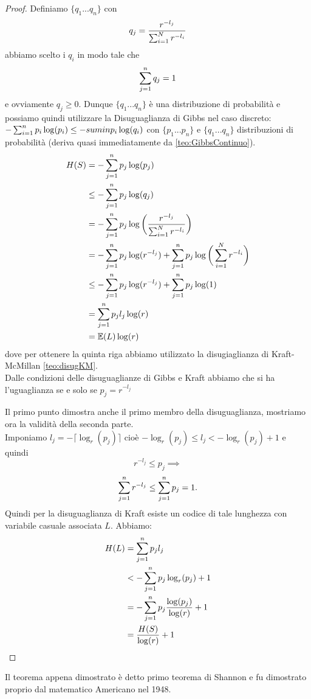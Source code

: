 \begin{proof}
\item Definiamo $\{q_1...q_n \}$ con
\begin{equation}
q_j=\frac{r^{-l_j}}{\sum_{i=1}^N r^{-l_i}}
\end{equation}
abbiamo scelto i $q_i$ in modo tale che 
$$\sum_{j=1}^n q_j=1$$
e ovviamente $q_j\geq 0$.
Dunque $\{q_1...q_n \}$ è una distribuzione di probabilità e possiamo quindi utilizzare la Disuguaglianza di Gibbs nel caso discreto: $- \sum_{i=1}^n p_i \log(p_i) \leq -sumin p_i \log(q_i)$ con $\{p_1...p_n \}$ e $\{q_1...q_n \}$ distribuzioni di probabilità (deriva quasi immediatamente da \ref{teo:GibbsContinuo}).\\
\[
\begin{split}
H(S)& = - \sum_{j=1}^n p_j \log(p_j) \\
& \leq  - \sum_{j=1}^n p_j \log(q_j)\\
& =  - \sum_{j=1}^n p_j \log \bigg(\frac{r^{-l_j}}{\sum_{i=1}^N r^{-l_i}} \bigg)\\
& =  - \sum_{j=1}^n p_j \log ( r^{-l_j}) +\sum_{j=1}^n p_j \log \bigg( \sum_{i=1}^N r^{-l_i} \bigg)\\
& \leq - \sum_{j=1}^n p_j \log ( r^{-l_j}) +\sum_{j=1}^n p_j \log (1)\\
& =\sum_{j=1}^n p_j l_j \log ( r)\\
&= \mathbb{E}(L)\log (r)
\end{split}
\]
dove per ottenere la quinta riga abbiamo utilizzato la disugiaglianza di Kraft-McMillan \ref{teo:disugKM}.\\
Dalle condizioni delle disuguaglianze di Gibbs e Kraft abbiamo che si ha l'uguaglianza se e solo se $p_j=r^{-l_j}$
\item  Il primo punto dimostra anche il primo membro della disuguaglianza, mostriamo ora la validità della seconda parte.\\
Imponiamo $l_j =  -\lceil \log_r(p_j) \rceil$ cioè  $- \log_r(p_j) \leq l_j < - \log_r(p_j) +1$ e quindi 
$$r^{-l_j} \leq p_j \implies $$ 
$$  \sum_{j=1}^n r^{-l_j} \leq \sum_{j=1}^n p_j=1.$$
Quindi per la disuguaglianza di Kraft esiste un codice di tale lunghezza con variabile casuale associata $L$. Abbiamo:
 \[
\begin{split}
H(L)& =  \sum_{j=1}^n p_j l_j \\
& <   - \sum_{j=1}^n p_j  \log_r(p_j) +1\\
& = - \sum_{j=1}^n p_j  \frac{\log(p_j)}{\log(r)} +1 \\
& =  \frac{H(S)}{ \log (r)} +1
\end{split}
\]
\end{proof}
Il teorema appena dimostrato è detto primo teorema di Shannon e fu dimostrato proprio dal matematico Americano nel 1948.\\


